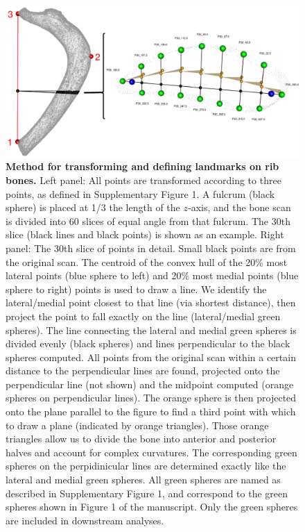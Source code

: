 \documentclass[12pt]{article}
\begin{document}
 
\begin{figure}
\begin{center}
  \includegraphics[width=\textwidth]{S3}
\end{center}
\caption{
\textbf{Method for transforming and defining landmarks on rib bones.} Left panel: All points are transformed according to three points, as 
defined in Supplementary Figure 1. A fulcrum (black sphere) is placed at 1/3 the length of the $z$‐axis, and the bone scan is divided into 60 slices of equal angle 
from that fulcrum. The 30th slice (black lines and black points) is shown as an example. Right panel: The 30th slice of points in detail. Small black points are from 
the original scan. The centroid of the convex hull of the 20\% most lateral points (blue sphere to left) and 20\% most medial points (blue sphere to right) points is 
used to draw a line. We identify the lateral/medial point closest to that line (via shortest distance), then project the point to fall exactly on the line 
(lateral/medial green spheres). The line connecting the lateral and medial green spheres is divided evenly (black spheres) and lines perpendicular to the black 
spheres computed. All points from the original scan within a certain distance to the perpendicular lines are found, projected onto the perpendicular line (not 
shown) and the midpoint computed (orange spheres on perpendicular lines). The orange sphere is then projected onto the plane parallel to the figure to find a 
third point with which to draw a plane (indicated by orange triangles). Those orange triangles allow us to divide the bone into anterior and posterior halves and 
account for complex curvatures. The corresponding green spheres on the perpidinicular lines are determined exactly like the lateral and medial green spheres. 
All green spheres are named as described in Supplementary Figure 1, and correspond to the green spheres shown in Figure 1 of the manuscript. Only the green 
spheres are included in downstream analyses. 
}
\end{figure}
\end{document}
